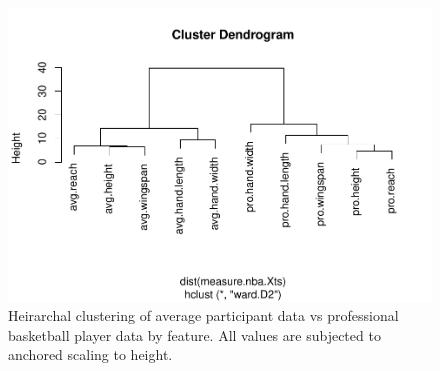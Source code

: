 \documentclass[]{article}
\begin{document}
\begin{figure}
\centering
\includegraphics{project-measure-writeup_files/figure-latex/appendix-cluster-analysis-1.pdf}
\caption{Heirarchal clustering of average participant data vs
professional basketball player data by feature. All values are subjected
to anchored scaling to height.}
\end{figure}






\newpage
\theendnotes

\newpage
\begin{auxmulticols}{2}
\singlespacing 


\end{auxmulticols}

\newpage
{
\hypersetup{linkcolor=black}
\setcounter{tocdepth}{3}
\tableofcontents
}
\end{document}
